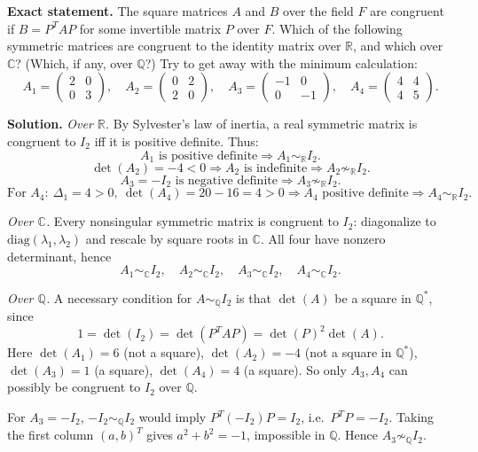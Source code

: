 \documentclass[12pt,a4paper]{article}
\theoremstyle{plain}
\theoremstyle{definition}      %
\begin{document}
\textbf{Exact statement.}
The square matrices $A$ and $B$ over the field $F$ are congruent if $B=P^{T}AP$ for some invertible matrix $P$ over $F$.
Which of the following symmetric matrices are congruent to the identity matrix over $\mathbb R$, and which over $\mathbb C$?
(Which, if any, over $\mathbb Q$?) Try to get away with the minimum calculation:
\[
A_1=\begin{pmatrix}2&0\\0&3\end{pmatrix},\quad
A_2=\begin{pmatrix}0&2\\2&0\end{pmatrix},\quad
A_3=\begin{pmatrix}-1&0\\0&-1\end{pmatrix},\quad
A_4=\begin{pmatrix}4&4\\4&5\end{pmatrix}.
\]

\textbf{Solution.}
\emph{Over $\mathbb R$.} By Sylvester’s law of inertia, a real symmetric matrix is congruent to $I_2$ iff it is positive definite.
Thus:
\[
A_1 \text{ is positive definite} \Rightarrow A_1\sim_{\mathbb R} I_2.
\]
\[
\det(A_2)=-4<0 \Rightarrow A_2 \text{ is indefinite} \Rightarrow A_2\not\sim_{\mathbb R} I_2.
\]
\[
A_3=-I_2 \text{ is negative definite} \Rightarrow A_3\not\sim_{\mathbb R} I_2.
\]
\[
\text{For }A_4:\ \Delta_1=4>0,\ \det(A_4)=20-16=4>0 \Rightarrow A_4 \text{ positive definite} \Rightarrow A_4\sim_{\mathbb R} I_2.
\]

\emph{Over $\mathbb C$.} Every nonsingular symmetric matrix is congruent to $I_2$: diagonalize to $\mathrm{diag}(\lambda_1,\lambda_2)$ and rescale by square roots in $\mathbb C$.
All four have nonzero determinant, hence
\[
A_1\sim_{\mathbb C} I_2,\quad A_2\sim_{\mathbb C} I_2,\quad A_3\sim_{\mathbb C} I_2,\quad A_4\sim_{\mathbb C} I_2.
\]

\emph{Over $\mathbb Q$.} A necessary condition for $A\sim_{\mathbb Q} I_2$ is that $\det(A)$ be a square in $\mathbb Q^*$, since
\[
1=\det(I_2)=\det(P^TAP)=\det(P)^2\det(A).
\]
Here $\det(A_1)=6$ (not a square), $\det(A_2)=-4$ (not a square in $\mathbb Q^*$), $\det(A_3)=1$ (a square), $\det(A_4)=4$ (a square).
So only $A_3,A_4$ can possibly be congruent to $I_2$ over $\mathbb Q$.

For $A_3=-I_2$, $-I_2\sim_{\mathbb Q} I_2$ would imply $P^T(-I_2)P=I_2$, i.e.\ $P^TP=-I_2$.
Taking the first column $(a,b)^T$ gives $a^2+b^2=-1$, impossible in $\mathbb Q$.
Hence $A_3\not\sim_{\mathbb Q} I_2$.
\end{document}
